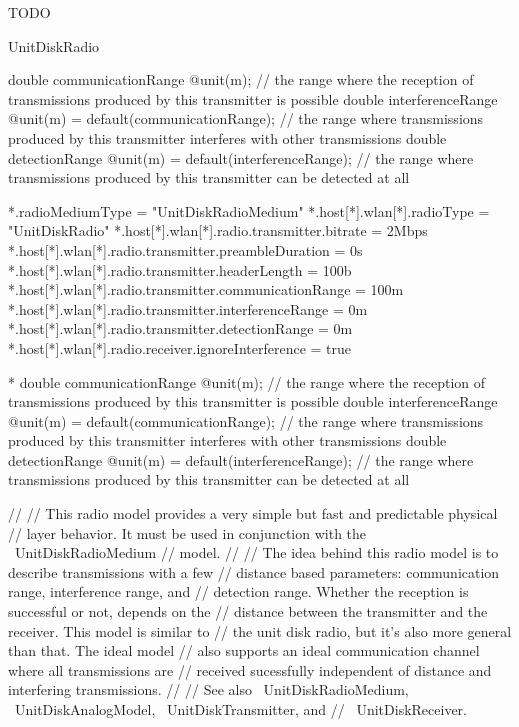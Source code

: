 TODO

UnitDiskRadio

        double communicationRange @unit(m);                              // the range where the reception of transmissions produced by this transmitter is possible
        double interferenceRange @unit(m) = default(communicationRange); // the range where transmissions produced by this transmitter interferes with other transmissions
        double detectionRange @unit(m) = default(interferenceRange);     // the range where transmissions produced by this transmitter can be detected at all

\begin{inifile}
*.radioMediumType = "UnitDiskRadioMedium"
*.host[*].wlan[*].radioType = "UnitDiskRadio"
*.host[*].wlan[*].radio.transmitter.bitrate = 2Mbps
*.host[*].wlan[*].radio.transmitter.preambleDuration = 0s
*.host[*].wlan[*].radio.transmitter.headerLength = 100b
*.host[*].wlan[*].radio.transmitter.communicationRange = 100m
*.host[*].wlan[*].radio.transmitter.interferenceRange = 0m    %
*.host[*].wlan[*].radio.transmitter.detectionRange = 0m
*.host[*].wlan[*].radio.receiver.ignoreInterference = true
\end{inifile}

*
        double communicationRange @unit(m);                              // the range where the reception of transmissions produced by this transmitter is possible
        double interferenceRange @unit(m) = default(communicationRange); // the range where transmissions produced by this transmitter interferes with other transmissions
        double detectionRange @unit(m) = default(interferenceRange);     // the range where transmissions produced by this transmitter can be detected at all



//
// This radio model provides a very simple but fast and predictable physical
// layer behavior. It must be used in conjunction with the ~UnitDiskRadioMedium
// model.
//
// The idea behind this radio model is to describe transmissions with a few
// distance based parameters: communication range, interference range, and
// detection range. Whether the reception is successful or not, depends on the
// distance between the transmitter and the receiver. This model is similar to
// the unit disk radio, but it's also more general than that. The ideal model
// also supports an ideal communication channel where all transmissions are
// received sucessfully independent of distance and interfering transmissions.
//
// See also ~UnitDiskRadioMedium, ~UnitDiskAnalogModel, ~UnitDiskTransmitter, and
// ~UnitDiskReceiver.


